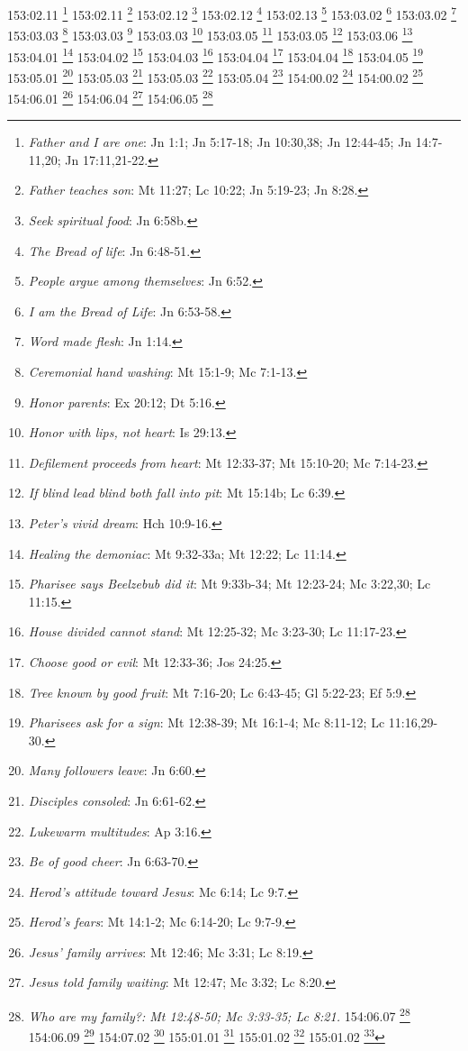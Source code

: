 {{{{{{{{{{{{{{{{{{{{{{{{{{{{{{{{153:02.11 \footnote{\textit{Father and I are one}: Jn 1:1; Jn 5:17-18; Jn 10:30,38; Jn 12:44-45; Jn 14:7-11,20; Jn 17:11,21-22.}
153:02.11 \footnote{\textit{Father teaches son}: Mt 11:27; Lc 10:22; Jn 5:19-23; Jn 8:28.}
153:02.12 \footnote{\textit{Seek spiritual food}: Jn 6:58b.}
153:02.12 \footnote{\textit{The Bread of life}: Jn 6:48-51.}
153:02.13 \footnote{\textit{People argue among themselves}: Jn 6:52.}
153:03.02 \footnote{\textit{I am the Bread of Life}: Jn 6:53-58.}
153:03.02 \footnote{\textit{Word made flesh}: Jn 1:14.}
153:03.03 \footnote{\textit{Ceremonial hand washing}: Mt 15:1-9; Mc 7:1-13.}
153:03.03 \footnote{\textit{Honor parents}: Ex 20:12; Dt 5:16.}
153:03.03 \footnote{\textit{Honor with lips, not heart}: Is 29:13.}
153:03.05 \footnote{\textit{Defilement proceeds from heart}: Mt 12:33-37; Mt 15:10-20; Mc 7:14-23.}
153:03.05 \footnote{\textit{If blind lead blind both fall into pit}: Mt 15:14b; Lc 6:39.}
153:03.06 \footnote{\textit{Peter's vivid dream}: Hch 10:9-16.}
153:04.01 \footnote{\textit{Healing the demoniac}: Mt 9:32-33a; Mt 12:22; Lc 11:14.}
153:04.02 \footnote{\textit{Pharisee says Beelzebub did it}: Mt 9:33b-34; Mt 12:23-24; Mc 3:22,30; Lc 11:15.}
153:04.03 \footnote{\textit{House divided cannot stand}: Mt 12:25-32; Mc 3:23-30; Lc 11:17-23.}
153:04.04 \footnote{\textit{Choose good or evil}: Mt 12:33-36; Jos 24:25.}
153:04.04 \footnote{\textit{Tree known by good fruit}: Mt 7:16-20; Lc 6:43-45; Gl 5:22-23; Ef 5:9.}
153:04.05 \footnote{\textit{Pharisees ask for a sign}: Mt 12:38-39; Mt 16:1-4; Mc 8:11-12; Lc 11:16,29-30.}
153:05.01 \footnote{\textit{Many followers leave}: Jn 6:60.}
153:05.03 \footnote{\textit{Disciples consoled}: Jn 6:61-62.}
153:05.03 \footnote{\textit{Lukewarm multitudes}: Ap 3:16.}
153:05.04 \footnote{\textit{Be of good cheer}: Jn 6:63-70.}
154:00.02 \footnote{\textit{Herod's attitude toward Jesus}: Mc 6:14; Lc 9:7.}
154:00.02 \footnote{\textit{Herod's fears}: Mt 14:1-2; Mc 6:14-20; Lc 9:7-9.}
154:06.01 \footnote{\textit{Jesus' family arrives}: Mt 12:46; Mc 3:31; Lc 8:19.}
154:06.04 \footnote{\textit{Jesus told family waiting}: Mt 12:47; Mc 3:32; Lc 8:20.}
154:06.05 \footnote{\textit{Who are my family?: Mt 12:48-50; Mc 3:33-35; Lc 8:21.}
154:06.07 \footnote{\textit{Blessed is the womb}: Lc 11:27-28.}
154:06.09 \footnote{\textit{Foes in own household}: Mt 10:35-36; Mc 13:12; Lc 12:52-53.}
154:07.02 \footnote{\textit{No place to lay head}: Mt 8:20; Lc 9:58.}
155:01.01 \footnote{\textit{Why do the heathen rage}: Sal 2:1-3; Sal 46:6; Hch 4:25-26.}
155:01.02 \footnote{\textit{Correcting views of God}: Sal 2:4-5.}
155:01.02 \footnote{\textit{Heathen for inheritance}: Sal 2:8.}
}}}}}}}}}}}}}}}}}}}}}}}}}}}}}}}}}
